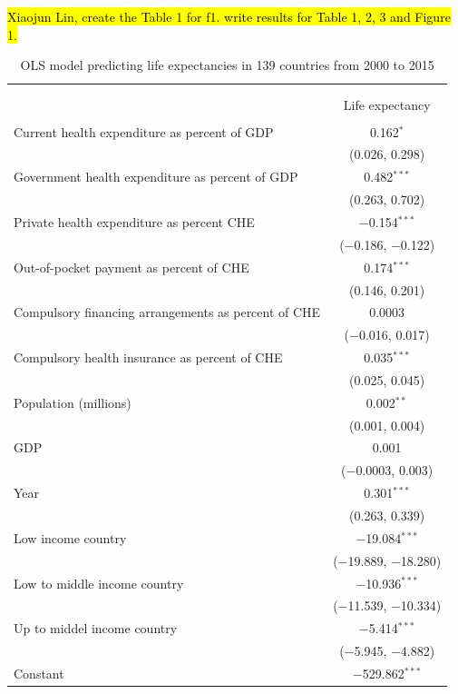 \documentclass[]{elsarticle} %
\begin{document}
\hl{Xiaojun Lin, create the Table 1 for f1. write results for Table 1, 2, 3 and Figure 1.}

\begin{table}[!htbp] \centering 
  \caption{OLS model predicting life expectancies in 139 countries from 2000 to 2015} 
  \label{poolOLS} 
\begin{tabular}{@{\extracolsep{5pt}}lc} 
\\[-1.8ex]\hline \\[-1.8ex] 
\\[-1.8ex] & Life expectancy \\ 
\hline \\[-1.8ex] 
 Current health expenditure as percent of GDP & 0.162$^{*}$ \\ 
  & (0.026, 0.298) \\ 
  Government health expenditure as percent of GDP & 0.482$^{***}$ \\ 
  & (0.263, 0.702) \\ 
  Private health expenditure as percent CHE & $-$0.154$^{***}$ \\ 
  & ($-$0.186, $-$0.122) \\ 
  Out-of-pocket payment as percent of CHE & 0.174$^{***}$ \\ 
  & (0.146, 0.201) \\ 
  Compulsory financing arrangements as percent of CHE & 0.0003 \\ 
  & ($-$0.016, 0.017) \\ 
  Compulsory health insurance as percent of CHE & 0.035$^{***}$ \\ 
  & (0.025, 0.045) \\ 
  Population (millions) & 0.002$^{**}$ \\ 
  & (0.001, 0.004) \\ 
  GDP & 0.001 \\ 
  & ($-$0.0003, 0.003) \\ 
  Year & 0.301$^{***}$ \\ 
  & (0.263, 0.339) \\ 
  Low income country & $-$19.084$^{***}$ \\ 
  & ($-$19.889, $-$18.280) \\ 
  Low to middle income country & $-$10.936$^{***}$ \\ 
  & ($-$11.539, $-$10.334) \\ 
  Up to middel income country & $-$5.414$^{***}$ \\ 
  & ($-$5.945, $-$4.882) \\ 
  Constant & $-$529.862$^{***}$ \\ 

\end{tabular}
\end{table}
\end{document}

